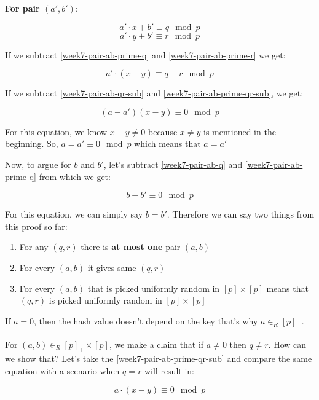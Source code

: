 \documentclass{article}
\begin{document}
\textbf{For pair $(a',b')$}:

\begin{equation}\label{week7-pair-ab-prime-q}
    a' \cdot x + b' \equiv q \mod p
\end{equation}
\begin{equation}\label{week7-pair-ab-prime-r}
    a' \cdot y + b' \equiv r \mod p
\end{equation}

If we subtract \eqref{week7-pair-ab-prime-q} and  \eqref{week7-pair-ab-prime-r} we get:

\begin{equation}\label{week7-pair-ab-prime-qr-sub}
    a' \cdot (x-y) \equiv q - r \mod p
\end{equation}

If we subtract \eqref{week7-pair-ab-qr-sub} and \eqref{week7-pair-ab-prime-qr-sub}, we get:

$$
(a-a')(x-y) \equiv 0 \mod p
$$

For this equation, we know $x-y \neq 0$ because $x\neq y$ is mentioned in the beginning. So, $a = a' \equiv 0 \mod p$ which means that $a = a'$

Now, to argue for $b$ and $b'$, let's subtract \eqref{week7-pair-ab-q} and \eqref{week7-pair-ab-prime-q} from which we get:

$$
b-b' \equiv 0 \mod p
$$

For this equation, we can simply say $b = b'$. Therefore we can say two things from this proof so far:

\begin{enumerate}
    \item For any $(q,r)$ there is \textbf{at most one} pair $(a,b)$
    \item For every $(a,b)$ it gives same $(q,r)$
    \item For every $(a,b)$ that is picked uniformly random in $[p] \times [p]$ means that $(q,r)$ is picked uniformly random in $[p] \times [p]$
\end{enumerate}

If $a = 0$, then the hash value doesn't depend on the key that's why $a \in_{R} {[p]}_{+}$.

For $(a,b) \in_{R} {[p]}_{+} \times [p]$, we make a claim that if $a \neq 0$ then $q \neq r$. How can we show that? Let's take the \eqref{week7-pair-ab-prime-qr-sub} and compare the same equation with a scenario when $q = r$ will result in:

$$
a \cdot (x-y) \equiv 0 \mod p
$$
\end{document}
